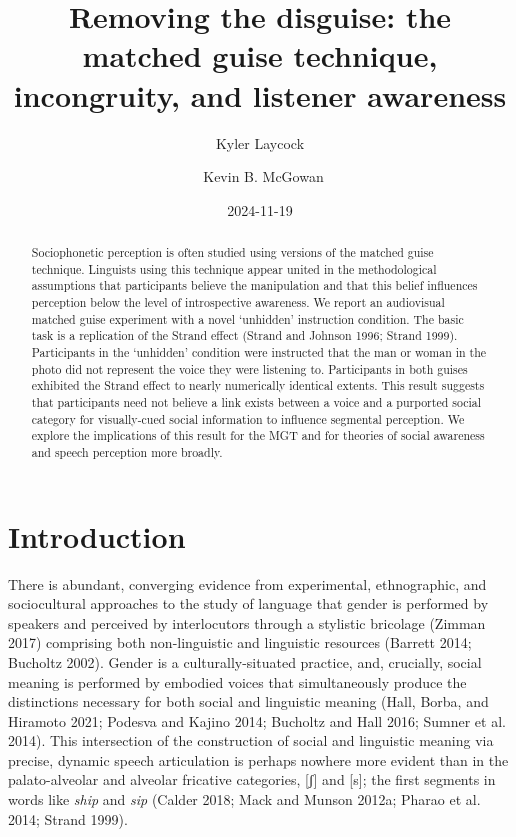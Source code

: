 \documentclass[
  letterpaper,
  DIV=11,
  numbers=noendperiod]{scrartcl}
\title{Removing the disguise: the matched guise technique, incongruity,
and listener awareness}
\author{Kyler Laycock \and ~Kevin B. McGowan}
\date{2024-11-19}
\begin{document}
\maketitle
\begin{abstract}
Sociophonetic perception is often studied using versions of the matched
guise technique. Linguists using this technique appear united in the
methodological assumptions that participants believe the manipulation
and that this belief influences perception below the level of
introspective awareness. We report an audiovisual matched guise
experiment with a novel `unhidden' instruction condition. The basic task
is a replication of the Strand effect (Strand and Johnson 1996; Strand
1999). Participants in the `unhidden' condition were instructed that the
man or woman in the photo did not represent the voice they were
listening to. Participants in both guises exhibited the Strand effect to
nearly numerically identical extents. This result suggests that
participants need not believe a link exists between a voice and a
purported social category for visually-cued social information to
influence segmental perception. We explore the implications of this
result for the MGT and for theories of social awareness and speech
perception more broadly.
\end{abstract}


\section{Introduction}\label{sec-intro}

There is abundant, converging evidence from experimental, ethnographic,
and sociocultural approaches to the study of language that gender is
performed by speakers and perceived by interlocutors through a stylistic
bricolage (Zimman 2017) comprising both non-linguistic and linguistic
resources (Barrett 2014; Bucholtz 2002). Gender is a culturally-situated
practice, and, crucially, social meaning is performed by embodied voices
that simultaneously produce the distinctions necessary for both social
and linguistic meaning (Hall, Borba, and Hiramoto 2021; Podesva and
Kajino 2014; Bucholtz and Hall 2016; Sumner et al. 2014). This
intersection of the construction of social and linguistic meaning via
precise, dynamic speech articulation is perhaps nowhere more evident
than in the palato-alveolar and alveolar fricative categories, {[}ʃ{]}
and {[}s{]}; the first segments in words like \emph{ship} and \emph{sip}
(Calder 2018; Mack and Munson 2012a; Pharao et al. 2014; Strand 1999).
\end{document}
